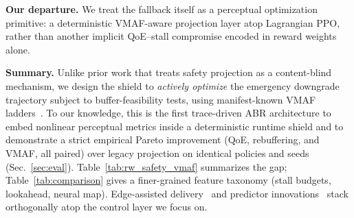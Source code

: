 \documentclass[preprint,12pt,times]{elsarticle}
\begin{document}
\textbf{Our departure.} We treat the fallback itself as a perceptual optimization primitive: a deterministic VMAF-aware projection layer atop Lagrangian PPO, rather than another implicit QoE--stall compromise encoded in reward weights alone.

\textbf{Summary.}
Unlike prior work that treats safety projection as a content-blind mechanism, we design the shield to \emph{actively optimize} the emergency downgrade trajectory subject to buffer-feasibility tests, using manifest-known VMAF ladders~\cite{li2016vmaf,alshiekh2018shielding}.
To our knowledge, this is the first trace-driven ABR architecture to embed nonlinear perceptual metrics inside a deterministic runtime shield and to demonstrate a strict empirical Pareto improvement (QoE, rebuffering, and VMAF, all paired) over legacy projection on identical policies and seeds (Sec.~\ref{sec:eval}).
Table~\ref{tab:rw_safety_vmaf} summarizes the gap; Table~\ref{tab:comparison} gives a finer-grained feature taxonomy (stall budgets, lookahead, neural map).
Edge-assisted delivery~\cite{kang2023adaptive,kim2023http} and predictor innovations~\cite{sun2016cs2p} stack orthogonally atop the control layer we focus on.
\end{document}
